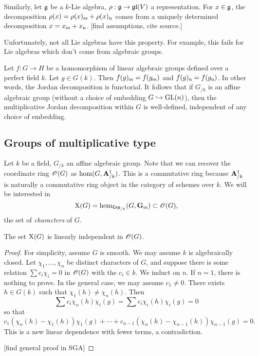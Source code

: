 Similarly, let $\mathfrak{g}$ be a $k$-Lie algebra, $\rho:\mathfrak{g}\to \mathfrak{gl}(V)$ a 
representation. For $x\in \mathfrak{g}$, the decomposition 
$\rho(x)=\rho(x)_{\mathrm{ss}}+\rho(x)_{\mathrm{n}}$ comes from a uniquely 
determined decomposition $x=x_{\mathrm{ss}}+x_{\mathrm{n}}$. [find assumptions, 
cite source.]

Unfortunately, not all Lie algebras have this property. For example, this fails 
for Lie algebras which don't come from algebraic groups. 

Let $f:G\to H$ be a homomorphism of linear algebraic groups defined over a 
perfect field $k$. Let $g\in G(k)$. Then 
$f(g)_{\mathrm{ss}}=f(g_{\mathrm{ss}})$ and $f(g)_{\mathrm{u}}=f(g_{\mathrm{u}})$. 
In other words, the Jordan decomposition is functorial. 
It follows that if $G_{/k}$ is an affine algebraic group (without a choice of 
embedding $G\hookrightarrow \operatorname{GL}(n)$), then the multiplicative Jordan 
decomposition within $G$ is well-defined, independent of any choice of 
embedding. 





\subsection{Groups of multiplicative type}

Let $k$ be a field, $G_{/k}$ an affine algebraic group. Note that we can 
recover the coordinate ring $\mathscr{O}(G)$ as $\hom(G,\mathbf{A}^1_{/k})$. This is a 
commutative ring because $\mathbf{A}^1_{/k}$ is naturally a commutative ring object 
in the category of schemes over $k$. We will be interested in 
\[
  \operatorname{X}(G) = \hom_{\mathsf{Grp}_{/k}}(G,\mathbf{G}_\mathrm{m}) \subset \mathscr{O}(G) ,
\]
the set of \emph{characters} of $G$. 

\begin{lemma}
The set $\operatorname{X}(G)$ is linearly independent in $\mathscr{O}(G)$. 
\end{lemma}
\begin{proof}
For simplicity, assume $G$ is smooth. We may assume $k$ is algebraically 
closed. Let $\chi_1,\dots,\chi_n$ be distinct 
characters of $G$, and suppose there is some relation 
$\sum c_i \chi_i=0$ in $\mathscr{O}(G)$ with the $c_i\in k$. We induct on $n$. If 
$n=1$, there is nothing to prove. In the general case, we may assume 
$c_1\ne 0$. There exists $h\in G(k)$ such that $\chi_1(h)\ne \chi_n(h)$. 
Then 
\[
  \sum c_i \chi_n(h)\chi_i(g) = \sum c_i \chi_i(h) \chi_i(g) = 0 
\]
so that 
\[
  c_1(\chi_n(h)-\chi_1(h))\chi_1(g) + \cdots + c_{n-1} (\chi_n(h)-\chi_{n-1}(h))\chi_{n-1}(g)=0 .
\]
This is a new linear dependence with fewer terms, a contradiction. 

[find general proof in SGA]
\end{proof}


